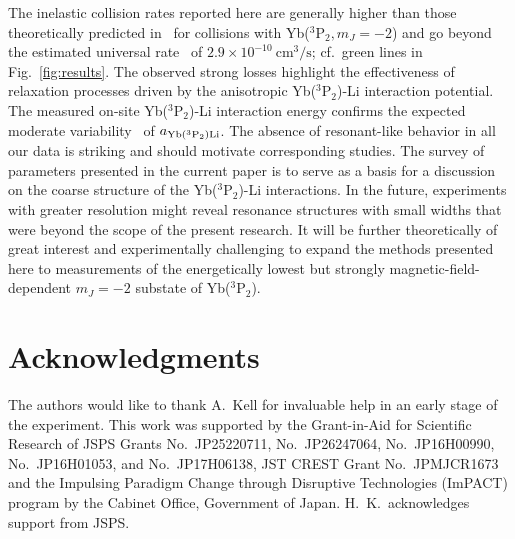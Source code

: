 \documentclass[twocolumn,superscriptaddress,showpacs,floatfix,amsmath,amssymb]{revtex4-1}
\newcommand{\triplet}{{}^3\mathrm{P}_2}
\newcommand{\cm}{\mathrm{cm}}
\newcommand{\s}{\mathrm{s}}
\begin{document}
The inelastic collision rates reported here are generally higher than those
theoretically predicted in~\cite{gonzalez-martinez_magnetically_2013} for
collisions with Yb($\triplet, m_J=-2$) and go beyond the estimated universal
rate~\cite{idziaszek_universal_2010, gonzalez-martinez_magnetically_2013} of
$2.9 \times 10^{-10}~\cm^3/\s$; cf.\ green lines in Fig.~\ref{fig:results}.
The observed strong losses highlight the effectiveness of relaxation processes
driven by the anisotropic Yb($\triplet$)-Li interaction potential. The
measured on-site Yb($\triplet$)-Li interaction energy confirms the expected
moderate variability~\cite{gonzalez-martinez_magnetically_2013} of $a_{{\rm
Yb}(\triplet){\rm Li}}$. The absence of resonant-like behavior in all our data
is striking and should motivate corresponding studies. The survey of
parameters presented in the current paper is to serve as a basis for a
discussion on the coarse structure of the Yb($\triplet$)-Li interactions. In
the future, experiments with greater resolution might reveal resonance
structures with small widths that were beyond the scope of the present
research. It will be further theoretically of great interest and
experimentally challenging to expand the methods presented here to
measurements of the energetically lowest but strongly magnetic-field-dependent
$m_J = -2$ substate of Yb($\triplet$).

\section*{Acknowledgments}
The authors would like to thank A.\ Kell for invaluable help in an early
stage of the experiment. This work was supported by the Grant-in-Aid for
Scientific Research of JSPS Grants No.\ JP25220711, No.\ JP26247064, No.\
JP16H00990, No.\ JP16H01053, and No.\ JP17H06138, JST CREST Grant No.\
JPMJCR1673 and the Impulsing Paradigm Change through Disruptive Technologies
(ImPACT) program by the Cabinet Office, Government of Japan. H.\ K.\
acknowledges support from JSPS.


\end{document}
